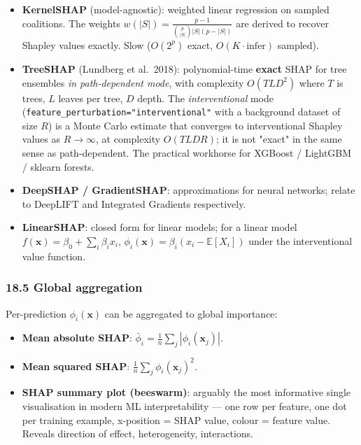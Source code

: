 \documentclass{article}
\providecommand{\tightlist}{\setlength{\itemsep}{0pt}\setlength{\parskip}{0pt}}
\begin{document}
\begin{itemize}
\tightlist
\item
  \textbf{KernelSHAP} (model-agnostic): weighted linear regression on
  sampled coalitions. The weights
  \(w(|S|) = \frac{p - 1}{\binom{p}{|S|} |S| (p - |S|)}\) are derived to
  recover Shapley values exactly. Slow (\(O(2^p)\) exact,
  \(O(K \cdot \text{infer})\) sampled).
\item
  \textbf{TreeSHAP} (Lundberg et al.\ 2018): polynomial-time
  \textbf{exact} SHAP for tree ensembles \emph{in path-dependent mode},
  with complexity \(O(TLD^2)\) where \(T\) is trees, \(L\) leaves per
  tree, \(D\) depth. The \emph{interventional} mode
  (\texttt{feature\_perturbation="interventional"} with a background
  dataset of size \(R\)) is a Monte Carlo estimate that converges to
  interventional Shapley values as \(R \to \infty\), at complexity
  \(O(TLDR)\); it is not "exact" in the same sense as path-dependent.
  The practical workhorse for XGBoost / LightGBM / sklearn forests.
\item
  \textbf{DeepSHAP / GradientSHAP}: approximations for neural networks;
  relate to DeepLIFT and Integrated Gradients respectively.
\item
  \textbf{LinearSHAP}: closed form for linear models; for a linear model
  \(f(\mathbf{x}) = \beta_0 + \sum_i \beta_i x_i\),
  \(\phi_i(\mathbf{x}) = \beta_i (x_i - \mathbb{E}[X_i])\) under the
  interventional value function.
\end{itemize}

\subsubsection{18.5 Global aggregation}\label{185-global-aggregation}

Per-prediction \(\phi_i(\mathbf{x})\) can be aggregated to global
importance:

\begin{itemize}
\tightlist
\item
  \textbf{Mean absolute SHAP}:
  \(\bar{\phi}_i = \tfrac{1}{n}\sum_j |\phi_i(\mathbf{x}_j)|\).
\item
  \textbf{Mean squared SHAP}:
  \(\tfrac{1}{n}\sum_j \phi_i(\mathbf{x}_j)^2\).
\item
  \textbf{SHAP summary plot (beeswarm)}: arguably the most informative
  single visualisation in modern ML interpretability --- one row per
  feature, one dot per training example, x-position = SHAP value, colour
  = feature value. Reveals direction of effect, heterogeneity,
  interactions.
\end{itemize}
\end{document}
